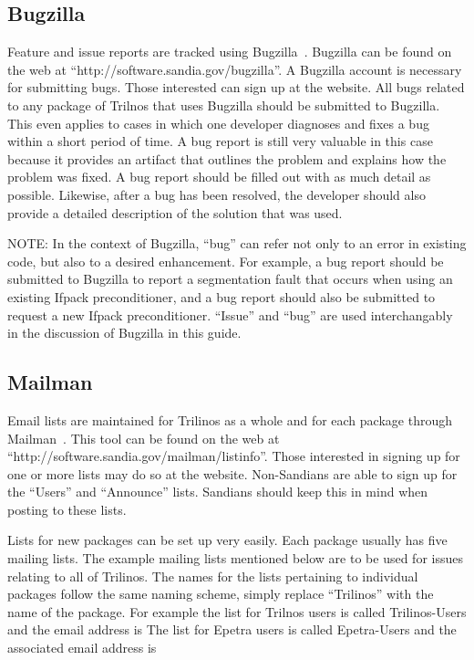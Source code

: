 \documentclass[12pt,relax]{TrilinosDevGuide}
\begin{document}
\subsection{Bugzilla}
\label{subsect:Bugzilla}
Feature and issue reports are tracked using Bugzilla~\cite{Bugzilla}.  
Bugzilla can be found on the web at ``http://software.sandia.gov/bugzilla''.  
A Bugzilla account is necessary for submitting bugs.  Those interested can 
sign up at the website.  All bugs related to any package of Trilnos that uses 
Bugzilla should be submitted to Bugzilla.  This even applies to cases in which 
one developer diagnoses and fixes a bug within a short period of time.  A bug 
report is still very valuable in this case because it provides an artifact 
that outlines the problem and explains how the problem was fixed.  A bug 
report should be filled out with as much detail as possible.  Likewise, after 
a bug has been resolved, the developer should also provide a detailed 
description of the solution that was used.

NOTE: In the context of Bugzilla, ``bug'' can refer not only to an error in 
existing code, but also to a desired enhancement.  For example, a bug report 
should be submitted to Bugzilla to report a segmentation fault that occurs 
when using an existing Ifpack preconditioner, and a bug report should also be
submitted to request a new Ifpack preconditioner.  ``Issue'' and ``bug'' are 
used interchangably in the discussion of Bugzilla in this guide.

\subsection{Mailman}

Email lists are maintained for Trilinos as a whole and for each package 
through Mailman~\cite{Mailman}.  This tool can be found on the web at 
``http://software.sandia.gov/mailman/listinfo''.  Those interested in signing 
up for one or more lists may do so at the website.  Non-Sandians are able to 
sign up for the ``Users'' and ``Announce'' lists.  Sandians should keep this 
in mind when posting to these lists.

Lists for new packages can be set up very easily.  Each package usually has 
five mailing lists.  The example mailing lists mentioned below are to be used 
for issues relating to all of Trilinos.  The names for the lists pertaining to 
individual packages follow the same naming scheme, simply replace ``Trilinos'' 
with the name of the package.  For example the list for Trilnos users is 
called Trilinos-Users and the email address is 
  The list 
for Epetra users is called Epetra-Users and the associated email address is 
\end{document}
